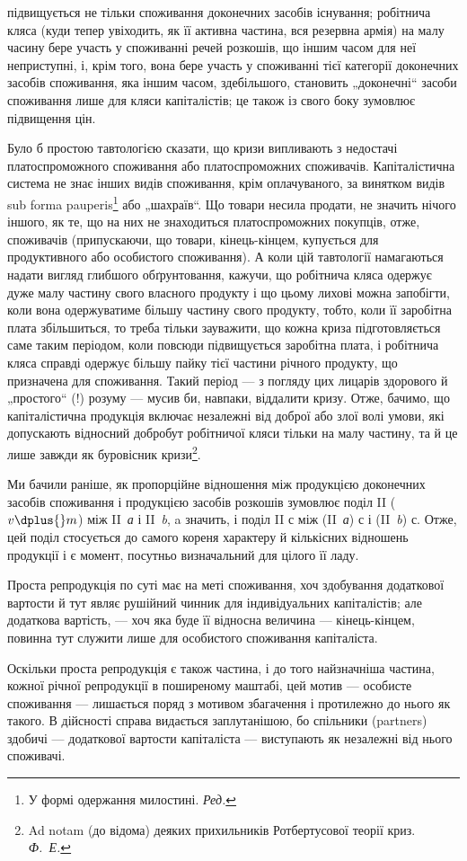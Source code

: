 \parcont{}  %
підвищується не тільки споживання доконечних засобів існування; робітнича
кляса (куди тепер увіходить, як її активна частина, вся резервна
армія) на малу часину бере участь у споживанні речей розкошів, що іншим
часом для неї неприступні, і, крім того, вона бере участь у споживанні
тієї категорії доконечних засобів споживання, яка іншим часом, здебільшого,
становить „доконечні“ засоби споживання лише для кляси капіталістів;
це також із свого боку зумовлює підвищення цін.

Було б простою тавтологією сказати, що кризи випливають з недостачі
платоспроможного споживання або платоспроможних споживачів.
Капіталістична система не знає інших видів споживання, крім оплачуваного,
за винятком видів sub forma pauperis\footnote*{
У формі одержання милостині. \emph{Ред.}
} або „шахраїв“. Що
товари несила продати, не значить нічого іншого, як те, що на них не
знаходиться платоспроможних покупців, отже, споживачів (припускаючи,
що товари, кінець-кінцем, купується для продуктивного або особистого
споживання). А коли цій тавтології намагаються надати вигляд
глибшого обґрунтовання, кажучи, що робітнича кляса одержує дуже малу
частину свого власного продукту і що цьому лихові можна запобігти,
коли вона одержуватиме більшу частину свого продукту, тобто, коли її
заробітна плата збільшиться, то треба тільки зауважити, що кожна криза
підготовляється саме таким періодом, коли повсюди підвищується заробітна
плата, і робітнича кляса справді одержує більшу пайку тієї частини
річного продукту, що призначена для споживання. Такий період — з погляду
цих лицарів здорового й „простого“ (!) розуму — мусив би, навпаки,
віддалити кризу. Отже, бачимо, що капіталістична продукція включає
незалежні від доброї або злої волі умови, які допускають відносний
добробут робітничої кляси тільки на малу частину, та й це лише завжди
як буровісник кризи\footnote{
Ad notam (до відома) деяких прихильників Ротбертусової теорії криз. \emph{Ф.~Е.}
}.

Ми бачили раніше, як пропорційне відношення між продукцією
доконечних засобів споживання і продукцією засобів розкошів зумовлює
поділ II ($v \dplus{} m$) між II~\emph{а} і II~\emph{b}, a значить, і поділ II $с$ між (II~\emph{а}) $с$ і (II~\emph{b}) $с$.
Отже, цей поділ стосується до самого кореня характеру й кількісних відношень
продукції і є момент, посутньо визначальний для цілого її ладу.

Проста репродукція по суті має на меті споживання, хоч здобування
додаткової вартости й тут являє рушійний чинник для індивідуальних
капіталістів; але додаткова вартість, — хоч яка буде її відносна величина —
кінець-кінцем, повинна тут служити лише для особистого споживання
капіталіста.

Оскільки проста репродукція є також частина, і до того найзначніша
частина, кожної річної репродукції в поширеному маштабі, цей мотив —
особисте споживання — лишається поряд з мотивом збагачення і протилежно
до нього як такого. В дійсності справа видається заплутанішою,
бо спільники (partners) здобичі — додаткової вартости капіталіста — виступають
як незалежні від нього споживачі.
